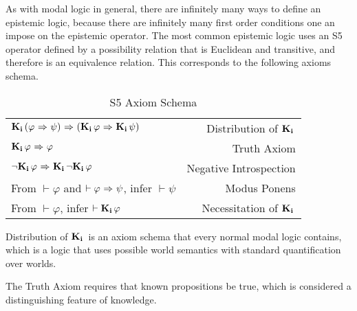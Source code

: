 As with modal logic in general, there are infinitely many ways to define an epistemic logic, because there are infinitely many first order conditions one an impose on the epistemic operator. The most common epistemic logic uses an S5 operator defined by a possibility relation that is Euclidean and transitive, and therefore is an equivalence relation. This corresponds to the following axioms schema.

\begin{table}[H]
	\begin{center}
		\begin{tabular}{| l r |}
			\hline
			$\mathbf{K}_{\mathbf{i}}\,(\varphi {\ \Rightarrow \ } \psi) {\ \Rightarrow \ } (\mathbf{K}_{\mathbf{i}}\,\varphi {\ \Rightarrow \ } \mathbf{K}_{\mathbf{i}}\,\psi)$ & Distribution of $\mathbf{K}_{\mathbf{i}}\,$ \\
			$\mathbf{K}_{\mathbf{i}}\,\varphi {\ \Rightarrow \ } \varphi$ & Truth Axiom \\
			${\neg}\mathbf{K}_{\mathbf{i}}\,\varphi {\ \Rightarrow \ } \mathbf{K}_{\mathbf{i}}\,{\neg}\mathbf{K}_{\mathbf{i}}\,\varphi$ & Negative Introspection\\
			From $\vdash \varphi$ and $\vdash \varphi {\ \Rightarrow \ } \psi$, infer $\vdash\psi$ & Modus Ponens\\
			From $\vdash \varphi$, infer $\vdash \mathbf{K}_{\mathbf{i}}\,\varphi$ & Necessitation of $\mathbf{K}_{\mathbf{i}}\,$\\
			\hline
		\end{tabular}
		\caption{S5 Axiom Schema}
	\end{center}
\end{table}
 
Distribution of $\mathbf{K}_{\mathbf{i}}\,$ is an axiom schema that every normal modal logic contains, which is a logic that uses possible world semantics with standard quantification over worlds.

The Truth Axiom requires that known propositions be true, which is considered a distinguishing feature of knowledge.

